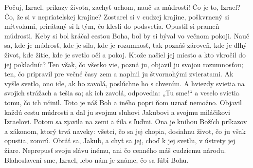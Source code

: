 Počuj, Izrael, príkazy života, zachyť uchom, nauč sa múdrosti!
Čo je to, Izrael? Čo, že si v nepriateľskej krajine?
Zostarel si v cudzej krajine, poškvrnený si mŕtvolami, prirátaný si k tým, čo klesli do podsvetia.
Opustil si prameň múdrosti.
Keby si bol kráčal cestou Boha, bol by si býval vo večnom pokoji.
Nauč sa, kde je múdrosť, kde je sila, kde je rozumnosť, tak poznáš zároveň, kde je dlhý život, kde žitie, kde je svetlo očí a pokoj.
Ktože našiel jej miesto a kto vkročil do jej pokladníc?
\versseparator
Ten však, čo všetko vie, pozná ju, objavil ju svojou rozumnosťou; ten, čo pripravil pre večné časy zem a naplnil ju štvornohými zvieratami.
Ak vyšle svetlo, ono ide, ak ho zavolá, poslúchne ho s chvením.
A hviezdy svietia na svojich strážach a tešia sa; ak ich zavolá, odpovedia: „Tu sme!“ a veselo svietia tomu, čo ich učinil.
\versseparator
Toto je náš Boh a iného popri ňom uznať nemožno.
Objavil každú cestu múdrosti a dal ju svojmu sluhovi Jakubovi a svojmu miláčikovi Izraelovi.
Potom sa zjavila na zemi a žila s ľuďmi.
Ona je knihou Božích príkazov a zákonom, ktorý trvá naveky: všetci, čo sa jej chopia, dosiahnu život, čo ju však opustia, zomrú.
\versseparator
Obráť sa, Jakub, a chyť sa jej, choď k jej svetlu, v ústrety jej žiare.
Neprepusť svoju slávu inému, ani čo cenného máš cudziemu národu.
\versseparator
Blahoslavení sme, Izrael, lebo nám je známe, čo sa ľúbi Bohu.